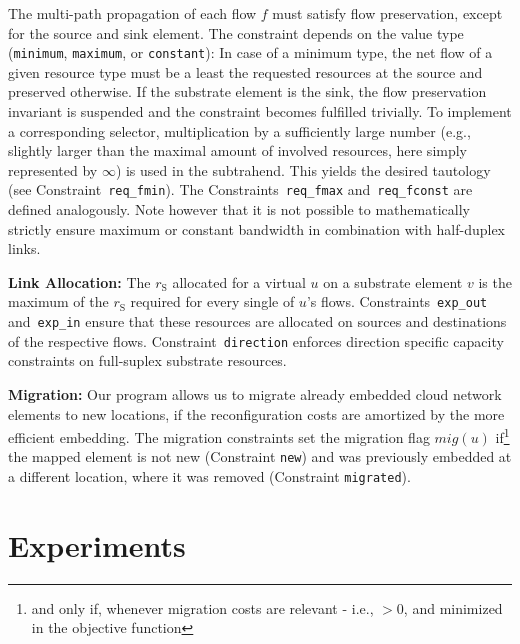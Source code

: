 \documentclass[conference,10pt]{IEEEtran}
\newcommand{\mrm}{\mathrm}
\begin{document}
\begin{description*}
  The multi-path propagation of each flow $f$ must satisfy flow preservation,
  except for the source and sink element. The constraint depends on the
  value type (\texttt{minimum}, \texttt{maximum}, or \texttt{constant}): In
  case of a minimum type, the net flow of a given resource type must be a
  least the requested resources at the source and preserved otherwise. If the
  substrate element is the sink, the flow preservation invariant is suspended
  and the constraint becomes fulfilled trivially. To implement a corresponding
  selector, multiplication by a sufficiently large number (e.g., slightly larger than
  the maximal amount of involved resources, here simply represented by $\infty$) is used in the subtrahend.
  This yields the desired tautology (see Constraint~\texttt{req\_fmin}). The
  Constraints~\texttt{req\_fmax} and~\texttt{req\_fconst} are defined analogously.
 Note however that it is not possible to mathematically strictly ensure maximum or constant bandwidth in combination with half-duplex links.

\item \textbf{Link Allocation:}
  The $r_\mrm{S}$ allocated for a virtual $u$ on a substrate element $v$ is the maximum of the $r_\mrm{S}$ required for every single of $u$'s flows.
  Constraints~\texttt{exp\_out} and~\texttt{exp\_in}
  ensure that these resources are allocated on sources and destinations of the respective flows.
  Constraint~\texttt{direction} enforces direction specific capacity constraints on full-suplex substrate resources.

\item \textbf{Migration:} Our program allows us to migrate already embedded cloud network
  elements to new locations, if the reconfiguration costs are amortized by the
  more efficient embedding.
  The migration constraints set the migration flag
  $mig(u)$ if\footnote{and only if, whenever migration costs are relevant - i.e., $> 0$, and minimized in the objective function}
  the mapped element is not new (Constraint
  \texttt{new}) and was previously embedded at a different location, where it was removed
  (Constraint \texttt{migrated}).
\end{description*}






\section{Experiments} \label{sec:experiments}
\end{document}

